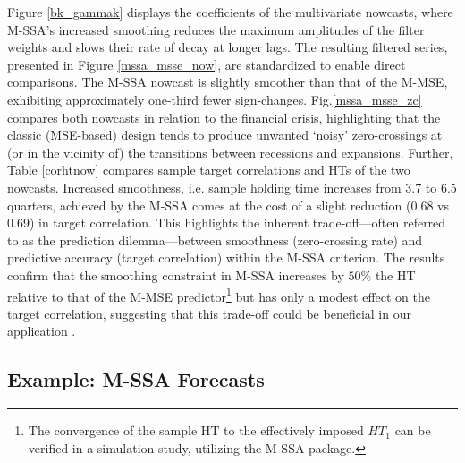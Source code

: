 \documentclass[11pt,a4paper]{article}
\begin{document}
Figure \ref{bk_gammak} displays the coefficients of the multivariate nowcasts, where M-SSA's increased smoothing reduces the maximum amplitudes of the filter weights and slows their rate of decay at longer lags. The resulting filtered series, presented in Figure \ref{mssa_msse_now}, are standardized to enable direct comparisons. The M-SSA nowcast is slightly smoother than that of the M-MSE, exhibiting approximately one-third fewer sign-changes. Fig.\ref{mssa_msse_zc} compares both nowcasts in relation to the financial crisis, highlighting that the classic (MSE-based) design tends to produce unwanted `noisy' zero-crossings at (or in the vicinity of) the transitions between recessions and expansions. Further, Table \ref{corhtnow} compares sample target correlations and HTs of the two nowcasts. Increased smoothness, i.e. sample holding time increases from 3.7 to 6.5 quarters, achieved by the M-SSA comes at the cost of a slight reduction (0.68 vs 0.69) in target correlation. This highlights the inherent trade-off—often referred to as the prediction dilemma—between smoothness (zero-crossing rate) and predictive accuracy (target correlation) within the M-SSA criterion. 
The results confirm that the smoothing constraint in M-SSA
increases by $50\%$ the HT relative to that of the M-MSE predictor\footnote{The convergence of the sample HT to the effectively imposed $HT_1$  can be verified in a simulation study, utilizing the M-SSA package.} but has only a modest effect on the target correlation, suggesting that this trade-off could be beneficial in our application
. %


\subsection{Example: M-SSA Forecasts}
\end{document}

